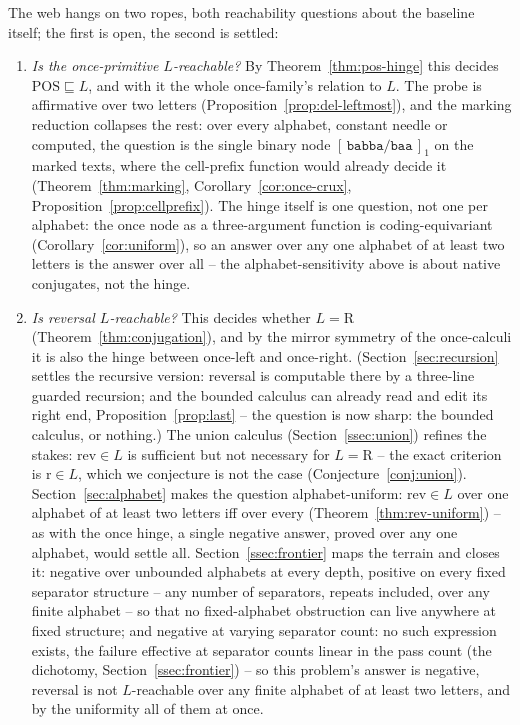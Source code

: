 \documentclass[runningheads,envcountsect]{llncs}
\begin{document}
The web hangs on two ropes, both reachability questions about the baseline itself; the first is open, the second is settled:
\begin{enumerate}
    \item \emph{Is the once-primitive $L$-reachable?} By Theorem~\ref{thm:pos-hinge} this decides $\mathrm{POS} \sqsubseteq L$, and with it the whole once-family's relation to $L$. The probe is affirmative over two letters (Proposition~\ref{prop:del-leftmost}), and the marking reduction collapses the rest: over every alphabet, constant needle or computed, the question is the single binary node $[\,\mathtt{babba}/\mathtt{baa}\,]_1$ on the marked texts, where the cell-prefix function would already decide it (Theorem~\ref{thm:marking}, Corollary~\ref{cor:once-crux}, Proposition~\ref{prop:cellprefix}). The hinge itself is one question, not one per alphabet: the once node as a three-argument function is coding-equivariant (Corollary~\ref{cor:uniform}), so an answer over any one alphabet of at least two letters is the answer over all -- the alphabet-sensitivity above is about native conjugates, not the hinge.
    \item \emph{Is reversal $L$-reachable?} This decides whether $L = \mathrm{R}$ (Theorem~\ref{thm:conjugation}), and by the mirror symmetry of the once-calculi it is also the hinge between once-left and once-right. (Section~\ref{sec:recursion} settles the recursive version: reversal is computable there by a three-line guarded recursion; and the bounded calculus can already read and edit its right end, Proposition~\ref{prop:last} -- the question is now sharp: the bounded calculus, or nothing.) The union calculus (Section~\ref{ssec:union}) refines the stakes: $\mathrm{rev} \in L$ is sufficient but not necessary for $L = \mathrm{R}$ -- the exact criterion is $\mathrm{r} \in L$, which we conjecture is not the case (Conjecture~\ref{conj:union}). Section~\ref{sec:alphabet} makes the question alphabet-uniform: $\mathrm{rev} \in L$ over one alphabet of at least two letters iff over every (Theorem~\ref{thm:rev-uniform}) -- as with the once hinge, a single negative answer, proved over any one alphabet, would settle all. Section~\ref{ssec:frontier} maps the terrain and closes it: negative over unbounded alphabets at every depth, positive on every fixed separator structure -- any number of separators, repeats included, over any finite alphabet -- so that no fixed-alphabet obstruction can live anywhere at fixed structure; and negative at varying separator count: no such expression exists, the failure effective at separator counts linear in the pass count (the dichotomy, Section~\ref{ssec:frontier}) -- so this problem's answer is negative, reversal is not $L$-reachable over any finite alphabet of at least two letters, and by the uniformity all of them at once.
\end{enumerate}
\end{document}
